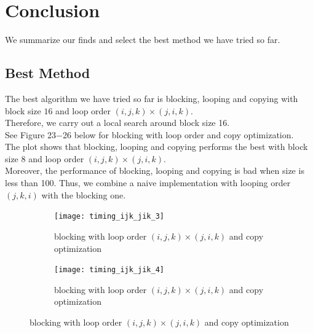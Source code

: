 \documentclass[12pt]{article}
\numberwithin{equation}{section}
\begin{document}
\section{Conclusion}

We summarize our finds and select the best method we have tried so far.

\subsection{Best Method}

The best algorithm we have tried so far is blocking, looping and copying with block size $16$ and loop order $(i, j, k)\times(j, i, k)$.
\\
Therefore, we carry out a local search around block size 16.
\\
See Figure 23$-$26 below for blocking with loop order and copy optimization.
\\
The plot shows that blocking, looping and copying performs the best with block size $8$ and loop order $(i, j, k)\times(j, i, k)$.
\\
Moreover, the performance of blocking, looping and copying is bad when size is less than 100. Thus, we combine a naive implementation with looping order $(j, k, i)$ with the blocking one.

\begin{figure}[!ht]
   \begin{subfigure}
      \centering
        \begin{center}
      \texttt{[image: timing\_ijk\_jik\_3]}
        \end{center}
      \label{aload0}
      \caption{blocking with loop order $(i, j, k)\times(j, i, k)$ and copy optimization}
  \end{subfigure}
  \begin{subfigure}
      \centering
        \begin{center}
      \texttt{[image: timing\_ijk\_jik\_4]}
        \end{center}
      \label{aload1}
      \caption{blocking with loop order $(i, j, k)\times(j, i, k)$ and copy optimization}
  \end{subfigure}

\end{figure}
\end{document}
